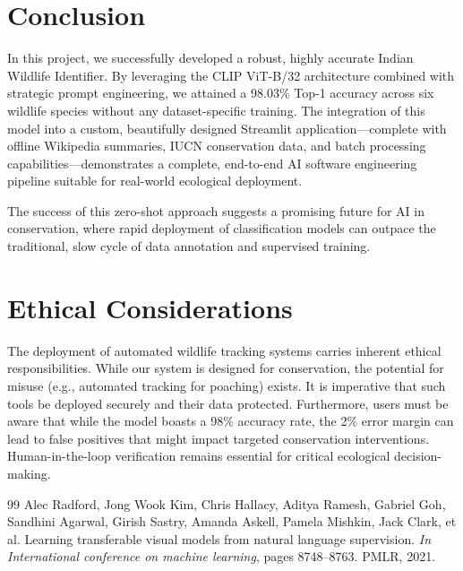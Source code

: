 \documentclass[11pt]{article}
\begin{document}
\section{Conclusion}

In this project, we successfully developed a robust, highly accurate Indian Wildlife Identifier. By leveraging the CLIP ViT-B/32 architecture combined with strategic prompt engineering, we attained a 98.03\% Top-1 accuracy across six wildlife species without any dataset-specific training. The integration of this model into a custom, beautifully designed Streamlit application—complete with offline Wikipedia summaries, IUCN conservation data, and batch processing capabilities—demonstrates a complete, end-to-end AI software engineering pipeline suitable for real-world ecological deployment. 

The success of this zero-shot approach suggests a promising future for AI in conservation, where rapid deployment of classification models can outpace the traditional, slow cycle of data annotation and supervised training.

\section*{Ethical Considerations}
The deployment of automated wildlife tracking systems carries inherent ethical responsibilities. While our system is designed for conservation, the potential for misuse (e.g., automated tracking for poaching) exists. It is imperative that such tools be deployed securely and their data protected. Furthermore, users must be aware that while the model boasts a 98\% accuracy rate, the 2\% error margin can lead to false positives that might impact targeted conservation interventions. Human-in-the-loop verification remains essential for critical ecological decision-making.

\begin{thebibliography}{99}
Alec Radford, Jong Wook Kim, Chris Hallacy, Aditya Ramesh, Gabriel Goh, Sandhini Agarwal, Girish Sastry, Amanda Askell, Pamela Mishkin, Jack Clark, et al.
\newblock Learning transferable visual models from natural language supervision.
\newblock \emph{In International conference on machine learning}, pages 8748--8763. PMLR, 2021.
\end{thebibliography}

\appendix
\end{document}
